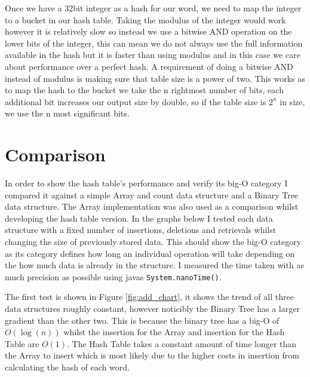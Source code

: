 \documentclass[12pt]{article}
\begin{document}
Once we have a 32bit integer as a hash for our word, we need to map the integer to a bucket in our hash table. Taking the modulus of the integer would work however it is relatively slow so instead we use a bitwise AND operation on the lower bits of the integer, this can mean we do not always use the full information available in the hash but it is faster than using modulus and in this case we care about performance over a perfect hash. A requirement of doing a bitwise AND instead of modulus is making sure that table size is a power of two. This works as to map the hash to the bucket we take the n rightmost number of bits, each additional bit increases our output size by double, so if the table size is $2^n$ in size, we use the n most significant bits.

\section{Comparison}

In order to show the hash table's performance and verify its big-O category I compared it against a simple Array and count data structure and a Binary Tree data structure. The Array implementation was also used as a comparison whilst developing the hash table version. In the graphs below I tested each data structure with a fixed number of insertions, deletions and retrievals whilst changing the size of previously stored data. This should show the big-O category as its category defines how long an individual operation will take depending on the how much data is already in the structure. I measured the time taken with as much precision as possible using javas \texttt{System.nanoTime()}.

The first test is shown in Figure \ref{fig:add_chart}, it shows the trend of all three data structures roughly constant, however noticibly the Binary Tree has a larger gradient than the other two. This is because the binary tree has a big-O of $O(\log(n))$ whilst the insertion for the Array and insertion for the Hash Table are $O(1)$. The Hash Table takes a constant amount of time longer than the Array to insert which is most likely due to the higher costs in insertion from calculating the hash of each word.
\end{document}

